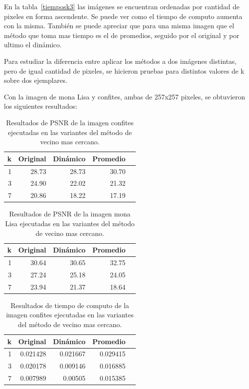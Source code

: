\documentclass[a4paper]{article}
\newcounter{col}
\begin{document}
En la tabla~\ref{tiemposk3} las imágenes se encuentran ordenadas por cantidad de pixeles en forma ascendente. Se puede ver como el tiempo de computo aumenta con la misma. También se puede apreciar que para una misma imagen que el método que toma mas tiempo es el de promedios, seguido por el original y por ultimo el dinámico.

Para estudiar la diferencia entre aplicar los métodos a dos imágenes distintas, pero de igual cantidad de pixeles, se hicieron pruebas para distintos valores de k sobre dos ejemplares. 

Con la imagen de mona Lisa y confites, ambas de 257x257 pixeles, se obtuvieron los siguientes resultados:

\begin{table}[H]
\centering
\begin{tabular}{|r|r|r|r|r|}
\hline
\multicolumn{1}{|c|}{k} & \multicolumn{1}{c|}{Original} & \multicolumn{1}{c|}{Dinámico} & \multicolumn{1}{c|}{Promedio} \\ \hline
1 & 28.73 & 28.73& 30.70 \\ \hline
3 & 24.90 &   22.02 & 21.32 \\ \hline
7 & 20.86 &  18.22 &  17.19 \\ \hline
\end{tabular}
\caption{Resultados de PSNR de la imagen confites ejecutadas en las variantes del m\'etodo de vecino mas cercano.}
\label{}
\end{table}

\begin{table}[H]
\centering
\begin{tabular}{|r|r|r|r|r|}
\hline
\multicolumn{1}{|c|}{k} & \multicolumn{1}{c|}{Original} & \multicolumn{1}{c|}{Dinámico} & \multicolumn{1}{c|}{Promedio} \\ \hline
1 & 30.64 & 30.65& 32.75 \\ \hline
3 & 27.24 &  25.18 & 24.05 \\ \hline
7 & 23.94&  21.37 &  18.64 \\ \hline
\end{tabular}
\caption{Resultados de PSNR de la imagen mona Lisa ejecutadas en las variantes del m\'etodo de vecino mas cercano.}
\label{}
\end{table}

\begin{table}[H]
\centering
\begin{tabular}{|r|r|r|r|r|}
\hline
\multicolumn{1}{|c|}{k} & \multicolumn{1}{c|}{Original} & \multicolumn{1}{c|}{Dinámico} & \multicolumn{1}{c|}{Promedio} \\ \hline
1 & 0.021428 & 0.021667 & 0.029415 \\ \hline
3 & 0.020178 &  0.009146 & 0.016885 \\ \hline
7 & 0.007989 &  0.00505 &  0.015385\\ \hline
\end{tabular}
\caption{Resultados de tiempo de computo de la imagen confites ejecutadas en las variantes del m\'etodo de vecino mas cercano.}
\label{}
\end{table}
\end{document}
